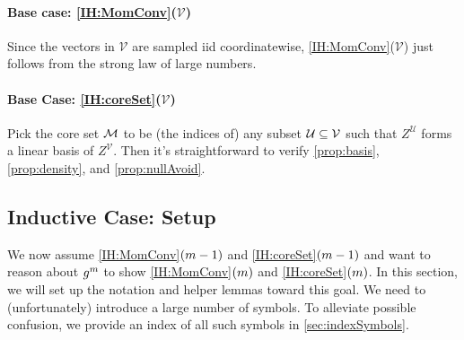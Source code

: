 \documentclass[main.tex]{subfiles}
\begin{document}
\paragraph{Base case: \ref{IH:MomConv}($\mathcal V$)}
Since the vectors in $\mathcal V$ are sampled iid coordinatewise, \ref{IH:MomConv}($\mathcal V$) just follows from the strong law of large numbers.

\paragraph{Base Case: \ref{IH:coreSet}($\mathcal V$)}
Pick the core set $\mathcal{M}$ to be (the indices of) any subset $\mathcal U \subseteq \mathcal V$ such that $Z^{\mathcal U}$ forms a linear basis of $Z^{\mathcal V}$.
Then it's straightforward to verify \ref{prop:basis}, \ref{prop:density}, and \ref{prop:nullAvoid}.

\subsection{Inductive Case: Setup}
\label{sec:inductiveSetup}

We now assume \ref{IH:MomConv}$(m-1)$ and \ref{IH:coreSet}$(m-1)$ and want to reason about $g^m$ to show \ref{IH:MomConv}$(m)$ and \ref{IH:coreSet}$(m)$.
In this section, we will set up the notation and helper lemmas toward this goal. 
We need to (unfortunately) introduce a large number of symbols.
To alleviate possible confusion, we provide an index of all such symbols in \cref{sec:indexSymbols}.
\end{document}
